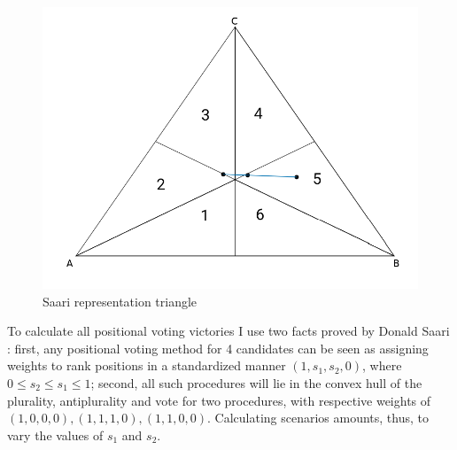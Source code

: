 \documentclass[hidelinks,11pt]{article}
\begin{document}
\begin{figure}[H]
 \centering
 \includegraphics[width=0.8\columnwidth,
 height=0.3\textheight]{./images/simpletriangle.png}
 \caption{Saari representation triangle}
 \label{fig:saari_nurmi}
\end{figure}

To calculate all positional voting victories I use two facts proved by Donald Saari \parencite{saari2012geometry, saari2001chaotic}: first, any positional voting method for 4 candidates can be seen as assigning weights to rank positions in a standardized manner \((1,s_{1},s_{2},0)\), where \(0 \leq s_{2} \leq s_{1} \leq 1\); second, all such procedures will lie in the convex hull of the plurality, antiplurality and vote for two procedures, with respective weights of \((1,0,0,0), (1,1,1,0), (1,1,0,0)\). Calculating scenarios amounts, thus, to vary the values of \(s_{1}\) and \(s_{2}\).
\end{document}
